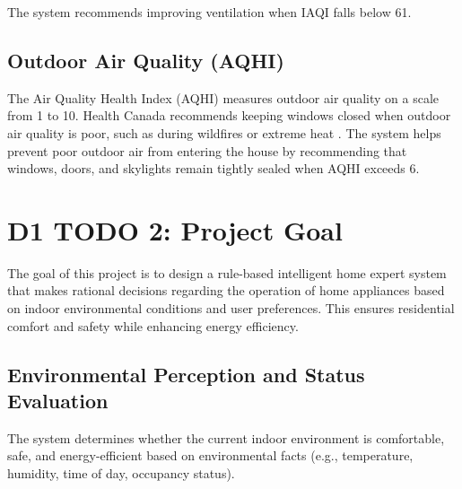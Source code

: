 \documentclass{article}
\begin{document}
The system recommends improving ventilation when IAQI falls below 61.

\subsection{Outdoor Air Quality (AQHI)}

The Air Quality Health Index (AQHI) measures outdoor air quality on a scale from 1 to 10. Health Canada recommends keeping windows closed when outdoor air quality is poor, such as during wildfires or extreme heat \cite{health_canada_home}. The system helps prevent poor outdoor air from entering the house by recommending that windows, doors, and skylights remain tightly sealed when AQHI exceeds 6.




\section{D1 TODO 2: Project Goal}

The goal of this project is to design a rule-based intelligent home expert system that makes rational decisions regarding the operation of home appliances based on indoor environmental conditions and user preferences. This ensures residential comfort and safety while enhancing energy efficiency.

\subsection{Environmental Perception and Status Evaluation}

The system determines whether the current indoor environment is comfortable, safe, and energy-efficient based on environmental facts (e.g., temperature, humidity, time of day, occupancy status).
\end{document}
